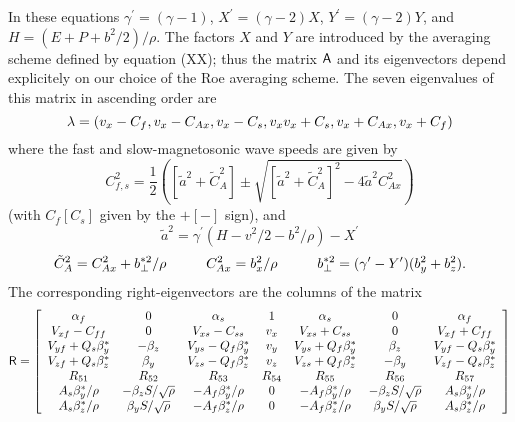 In these equations
$\gamma^{\prime} = (\gamma - 1)$, $X^{\prime} = (\gamma-2)X$,
$Y^{\prime} = (\gamma-2)Y$, and $H=(E+P+b^{2}/2)/\rho$.
The factors $X$ and $Y$ are introduced by the averaging scheme defined by
equation (XX); thus the matrix ${\sf A}$ and its eigenvectors depend
explicitely on our choice of the Roe averaging scheme.
The seven eigenvalues of this matrix in ascending order are
\begin{equation}
{\bf \lambda} = (v_{x}-C_{f}, v_{x}-C_{Ax}, v_{x}-C_{s}, v_{x}
v_{x}+C_{s}, v_{x}+C_{Ax}, v_{x}+C_{f})
\end{equation}
where the fast and slow-magnetosonic wave speeds are given by
\begin{equation}
C_{f,s}^2 = \frac{1}{2} \left( \left[\tilde{a}^{2}+\tilde{C}_{A}^{2}\right] \pm
\sqrt{\left[\tilde{a}^{2}+\tilde{C}_{A}^{2}\right]^{2} - 
4\tilde{a}^2 C_{Ax}^2}\right)
\end{equation}
(with $C_{f}[C_{s}]$ given by the $+[-]$ sign), and
\begin{equation}
\tilde{a}^{2} = \gamma^{\prime}\left( H-v^{2}/2-b^{2}/\rho \right) - X^{\prime}
\end{equation}
\begin{equation}
\tilde{C}_{A}^{2} = C_{Ax}^{2} + b_{\perp}^{\ast 2}/\rho \hspace*{1cm}
C_{Ax}^{2} = b_{x}^{2}/\rho \hspace*{1cm}
b_{\perp}^{\ast 2} = (\gamma^{\prime} - Y^{\prime})(b_{y}^{2} + b_{z}^{2}).
\end{equation}
The corresponding right-eigenvectors are the columns of the matrix
\begin{equation}
{\sf R} = \left[ \begin{array}{ccccccc}
\alpha_{f} & 0 & \alpha_{s} & 1 &\alpha_{s} & 0 & \alpha_{f} \\
V_{xf}-C_{ff} & 0 & V_{xs}-C_{ss} & v_{x} & V_{xs}+C_{ss} & 0 & V_{xf}+C_{ff} \\
V_{yf}+Q_{s}\beta_{y}^{\ast} & -\beta_{z} & V_{ys}-Q_{f}\beta_{y}^{\ast} & v_{y} & V_{ys}+Q_{f}\beta_{y}^{\ast} & \beta_{z} & V_{yf}-Q_{s}\beta_{y}^{\ast} \\
V_{zf}+Q_{s}\beta_{z}^{\ast} & \beta_{y} & V_{zs}-Q_{f}\beta_{z}^{\ast} & v_{z} & V_{zs}+Q_{f}\beta_{z}^{\ast} & -\beta_{y} & V_{zf}-Q_{s}\beta_{z}^{\ast} \\
R_{51} & R_{52} & R_{53} & R_{54} & R_{55} & R_{56} & R_{57} \\ 
A_{s}\beta_{y}^{\ast}/\rho & -\beta_{z}S/\sqrt{\rho} & -A_{f}\beta_{y}^{\ast}/\rho & 0 & -A_{f}\beta_{y}^{\ast}/\rho & -\beta_{z}S/\sqrt{\rho} & A_{s}\beta_{y}^{\ast}/\rho \\
A_{s}\beta_{z}^{\ast}/\rho & \beta_{y}S/\sqrt{\rho} & -A_{f}\beta_{z}^{\ast}/\rho & 0 & -A_{f}\beta_{z}^{\ast}/\rho & \beta_{y}S/\sqrt{\rho} & A_{s}\beta_{z}^{\ast}/\rho \end{array} \right]
\end{equation}
